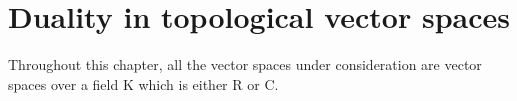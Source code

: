 \chapter{Duality in topological vector spaces}

Throughout this chapter, all the vector spaces under consideration are vector spaces over a field K which is either R or C.

